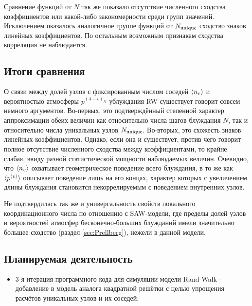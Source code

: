 Сравнение функций от $N$ так же показало отсутствие численного сходства коэффициентов или какой-либо закономерности среди групп значений. 
Исключением оказалось аналогичное группе функций от $N_{\textup{unique}}$ сходство знаков линейных коэффициентов.
По остальным возможным признакам сходства корреляция не наблюдается.

\subsection{Итоги сравнения}

О связи между долей узлов с фиксированным числом соседей $\langle n_v \rangle$ и вероятностью атмосферы $p^{(4-v)_N}$ ублуждания RW существует говорит совсем немного аргументов.
Во-первых, это подтверждённый степенной характер аппроксимации обеих величин как относительно числа шагов блуждания $N$, так и относительно числа уникальных узлов $N_{\textup{unique}}$.
Во-вторых, это схожесть знаков линейных коэффициентов. 
Однако, если она и существует, против чего говорит полное отсутствие численного сходства между коэффициентами, то крайне слабая, ввиду разной статистической мощности наблюдаемых величин. 
Очевидно, что $\langle n_v \rangle$ охватывает геометрическое поведение всего блуждания, в то же как $\langle p^{(v)} \rangle$ описывает поведение лишь на его концах, характер которых с увеличением длины блуждания становится некоррелируемым с поведением внутренних узлов.

Не подтвердилась так же и универсальность свойств локального координационного числа по отношению с SAW-модели, где пределы долей узлов и вероятностей атмосфер бесконечно-больших блужданий имели значительно большее сходство (раздел \ref{sec:Prellberg}), нежели в данной модели.

\subsection{Планируемая деятельность}

\begin{itemize}
\item 3-я итерация программного кода для симуляции модели Rand-Walk - добавление в модель аналога квадратной решётки с целью упрощения расчётов уникальных узлов и их соседей.
\end{itemize}
